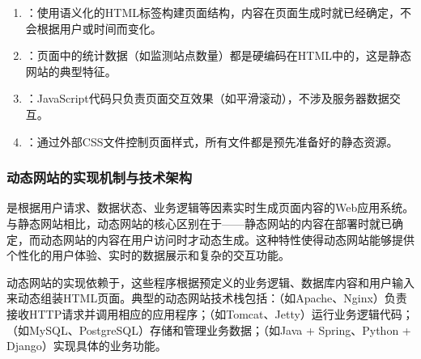 
\begin{enumerate}
\def\labelenumi{\arabic{enumi}.}
\item
  ：使用语义化的HTML标签构建页面结构，内容在页面生成时就已经确定，不会根据用户或时间而变化。
\item
  ：页面中的统计数据（如监测站点数量）都是硬编码在HTML中的，这是静态网站的典型特征。
\item
  ：JavaScript代码只负责页面交互效果（如平滑滚动），不涉及服务器数据交互。
\item
  ：通过外部CSS文件控制页面样式，所有文件都是预先准备好的静态资源。
\end{enumerate}

\hypertarget{ux52a8ux6001ux7f51ux7ad9ux7684ux5b9eux73b0ux673aux5236ux4e0eux6280ux672fux67b6ux6784}{%
\subsubsection{动态网站的实现机制与技术架构}\label{ux52a8ux6001ux7f51ux7ad9ux7684ux5b9eux73b0ux673aux5236ux4e0eux6280ux672fux67b6ux6784}}

是根据用户请求、数据状态、业务逻辑等因素实时生成页面内容的Web应用系统。与静态网站相比，动态网站的核心区别在于------静态网站的内容在部署时就已确定，而动态网站的内容在用户访问时才动态生成。这种特性使得动态网站能够提供个性化的用户体验、实时的数据展示和复杂的交互功能。

动态网站的实现依赖于，这些程序根据预定义的业务逻辑、数据库内容和用户输入来动态组装HTML页面。典型的动态网站技术栈包括：（如Apache、Nginx）负责接收HTTP请求并调用相应的应用程序；（如Tomcat、Jetty）运行业务逻辑代码；（如MySQL、PostgreSQL）存储和管理业务数据；（如Java + Spring、Python + Django）实现具体的业务功能。

